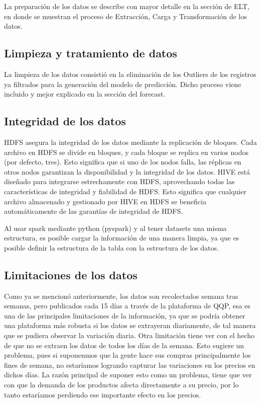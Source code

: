\documentclass{article}
\begin{document}
La preparación de los datos se describe con mayor detalle en la sección de ELT, en donde se muestran el proceso de Extracción, Carga y Transformación de los datos. 

\subsection{Limpieza y tratamiento de datos}

La limpieza de los datos consistió en la eliminación de los Outliers de los registros ya filtrados para la generación del modelo de predicción. Dicho proceso viene incluido y mejor explicado en la sección del forecast. 

\subsection{Integridad de los datos}


HDFS asegura la integridad de los datos mediante la replicación de bloques. Cada archivo en HDFS se divide en bloques, y cada bloque se replica en varios nodos (por defecto, tres). Esto significa que si uno de los nodos falla, las réplicas en otros nodos garantizan la disponibilidad y la integridad de los datos. HIVE está diseñado para integrarse estrechamente con HDFS, aprovechando todas las características de integridad y fiabilidad de HDFS. Esto significa que cualquier archivo almacenado y gestionado por HIVE en HDFS se beneficia automáticamente de las garantías de integridad de HDFS.

Al usar spark mediante python (pyspark) y al tener datasets una misma estructura, es posible cargar la información de una manera limpia, ya que es posible definir la estructura de la tabla con la estructura de los datos. 


\subsection{Limitaciones de los datos}

Como ya se mencionó anteriormente, los datos son recolectados semana tras semanas, pero publicados cada 15 días a través de la plataforma de QQP, esa es una de las principales limitaciones de la información, ya que se podría obtener una plataforma más robusta si los datos se extrayeran diariamente, de tal manera que se pudiera observar la variación diaria.
Otra limitación tiene ver con el hecho de que no se extraen los datos de todos los días de la semana. Esto sugiere un problema, pues si suponenmos que la gente hace sus compras principalmente los fines de semana, no estaríamos logrando capturar las variaciones en los precios en dichos días. La razón principal de suponer esto como un problema, tiene que ver con que la demanda de los productos afecta directamente a su precio, por lo tanto estaríamos perdiendo ese importante efecto en los precios. 
\end{document}
